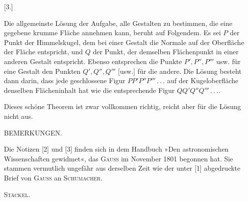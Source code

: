 %
\begin{center}[3.]\end{center}

Die allgemeinste Lösung der Aufgabe, alle Gestalten zu bestimmen, die eine gegebene krumme Fläche annehmen kann, beruht auf Folgendem. Es sei $P$ der Punkt der Himmelskugel, dem bei einer Gestalt die Normale auf der Oberfläche der Fläche entspricht, und $Q$ der Punkt, der demselben Flächenpunkt in einer anderen Gestalt entspricht. Ebenso entsprechen die Punkte $P',P'',P'''$ usw. für eine Gestalt den Punkten $Q',Q'',Q'''$ [usw.] für die andere. Die Lösung besteht dann darin, dass jede geschlossene Figur $PP'P''P'''\, .\, .\, .$ auf der Kugeloberfläche denselben Flächeninhalt hat wie die entsprechende Figur $QQ'Q''Q'''\, .\, .\, .$.

 Dieses schöne Theorem ist zwar vollkommen richtig, reicht aber für die Lösung nicht aus.

\begin{center}BEMERKUNGEN.\end{center}

Die Notizen [2] und [3] finden sich in dem Handbuch »Den astronomischen Wissenschaften gewidmet«, das \textsc{Gauss} im November 1801 begonnen hat. Sie stammen vermutlich ungefähr aus derselben Zeit wie der unter [1] abgedruckte Brief von \textsc{Gauss} an \textsc{Schumacher}.
\begin{flushright}\textsc{Stäckel}.\end{flushright}
